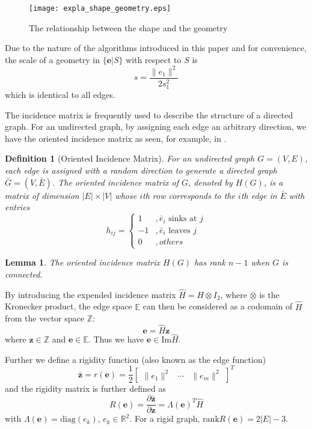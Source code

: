 \documentclass[times]{rncauth}
\newtheorem{lem}{Lemma}[section]
\newtheorem{defn}{Definition}[section]
\begin{document}
\begin{figure}
\centering
  \texttt{[image: expla\_shape\_geometry.eps]}\\
  \caption{The relationship between the shape and the geometry}\label{fig:expla_shape_geome}
\end{figure}



Due to the nature of the algorithms introduced in this paper and for
convenience, the scale of a geometry in $\{\mathbf{e}|S\}$ with
respect to $S$ is
$$s=\frac{\|e_1\|^2}{2s_1^2}$$
which is  identical to all edges.

The incidence matrix is frequently used to describe the structure of
a directed graph. For an  undirected graph, by assigning each edge
an arbitrary direction, we have the oriented incidence matrix as
seen, for example, in \cite{Diestel10}.
\begin{defn}[Oriented Incidence Matrix]
For an undirected graph $G=(V,E)$, each edge is assigned with a
random direction to generate a directed graph $\bar{G}=(V,\bar{E})$.
The oriented incidence matrix of $G$, denoted by $H(G)$, is a matrix
of dimension $|E|\times |V|$ whose $i$th row corresponds to the
$i$th edge in $\bar{E}$ with entries
\begin{equation*}
  h_{ij}=\begin{cases}
    1&, \bar{e}_i \text{ sinks at } j \\
    -1&, \bar{e}_i \text{ leaves }j\\
    0&, { others }
  \end{cases}
\end{equation*}
\end{defn}
\begin{lem}\label{lemma:rankofH}
  The oriented incidence matrix $H(G)$ has rank $n-1$ when $G$ is connected.
\end{lem}


  By introducing the expended incidence matrix $\hat{H}=H\otimes
  I_2$, where $\otimes$ is the Kronecker product, the edge space $\mathbb{E}$
   can then be considered as a
  codomain of $\hat{H}$ from the vector space $\mathbb{Z}$:
  $$\mathbf{e}=\hat{H}\mathbf{z}$$ where $\mathbf{z}\in \mathbb{Z}$ and $\mathbf{e}\in
  \mathbb{E}$. Thus we have $\mathbf{e}\in \text{Im} \hat{H}$.

Further we define a rigidity function\cite{Yu09minimalPersistent}
(also known as the edge function\cite{Dorfler09cooperativeBehavior})
\begin{equation}\label{eq:rigidityFun}
\bar{\mathbf{z}}=r(\mathbf{e})=\frac{1}{2}\begin{bmatrix}\|e_1\|^2&\cdots&\|e_m\|^2\end{bmatrix}^T
\end{equation}
and the rigidity matrix is further defined as
$$R(\mathbf{e})=\frac{\partial \bar{\mathbf{z}}}{\partial \mathbf{z}}=\Lambda(\mathbf{e})^T\hat{H}$$ with
$\Lambda(\mathbf{e})=\text{diag}(e_k)$, $e_k\in\mathbb{R}^2$. For a
rigid graph, $\text{rank}R(\mathbf{e})=2|E|-3$.
\end{document}
